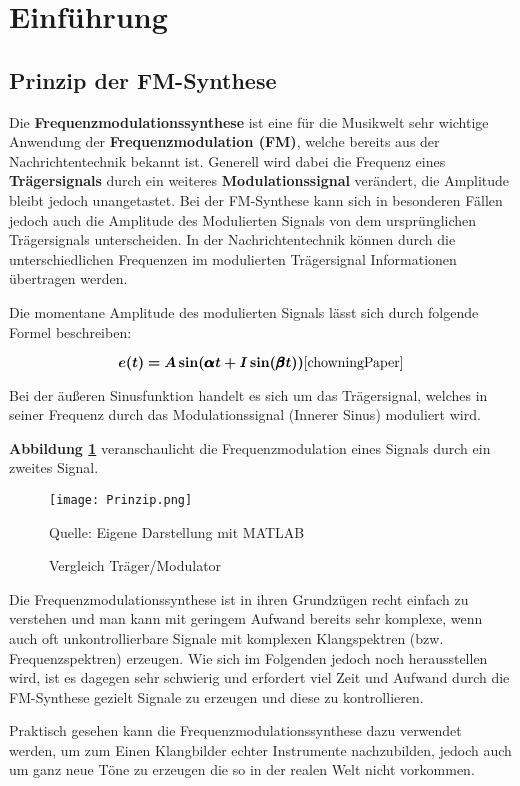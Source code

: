 \newpage
\section{Einführung}
\FloatBarrier
\subsection{Prinzip der FM-Synthese}
Die \textbf{Frequenzmodulationssynthese} ist eine für die Musikwelt sehr wichtige Anwendung der \textbf{Frequenzmodulation (FM)}, welche bereits aus der Nachrichtentechnik bekannt ist. Generell wird dabei die Frequenz eines \textbf{Trägersignals} durch ein weiteres \textbf{Modulationssignal} verändert, die Amplitude bleibt jedoch unangetastet. Bei der FM-Synthese kann sich in besonderen Fällen jedoch auch die Amplitude des Modulierten Signals von dem ursprünglichen Trägersignals unterscheiden. In der Nachrichtentechnik können durch die unterschiedlichen Frequenzen im modulierten Trägersignal Informationen übertragen werden. 

Die momentane Amplitude des modulierten Signals lässt sich durch folgende Formel beschreiben:

\[
\bm{e(t) = A\sin(\pmb{\alpha} t + I\sin(\pmb{\beta} t))} \cite{chowningPaper}
\]

Bei der äußeren Sinusfunktion handelt es sich um das Trägersignal, welches in seiner Frequenz durch das Modulationssignal (Innerer Sinus) moduliert wird.

\textbf{Abbildung \ref{fig:vergleichSignale}} veranschaulicht die Frequenzmodulation eines Signals durch ein zweites Signal.

\begin{figure} [ht]
\centering
  \texttt{[image: Prinzip.png]}
\caption{Vergleich Träger/Modulator}
\label{fig:vergleichSignale}
Quelle: Eigene Darstellung mit MATLAB
\end{figure}

Die Frequenzmodulationssynthese ist in ihren Grundzügen recht einfach zu verstehen und man kann mit geringem Aufwand bereits sehr komplexe, wenn auch oft unkontrollierbare Signale mit komplexen Klangspektren (bzw. Frequenzspektren) erzeugen. Wie sich im Folgenden jedoch noch herausstellen wird, ist es dagegen sehr schwierig und erfordert viel Zeit und Aufwand durch die FM-Synthese gezielt Signale zu erzeugen und diese zu kontrollieren.

Praktisch gesehen kann die Frequenzmodulationssynthese dazu verwendet werden, um zum Einen Klangbilder echter Instrumente nachzubilden, jedoch auch um ganz neue Töne zu erzeugen die so in der realen Welt nicht vorkommen.

